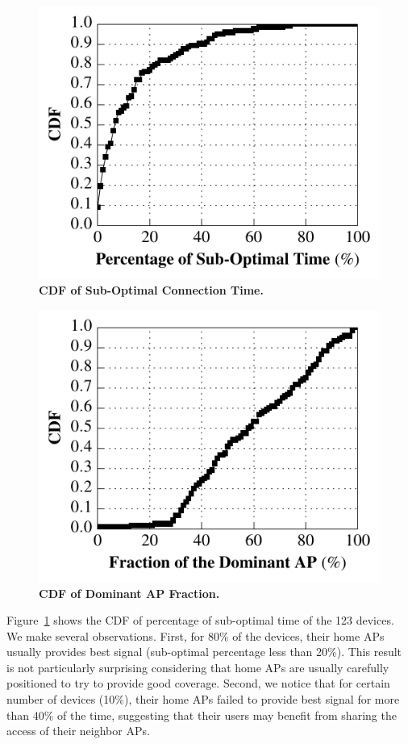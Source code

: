 \begin{figure}[t]
  \centering
  \includegraphics[width=\columnwidth]{./figures/HomeAPSessionRSSI.pdf}
  \caption{\textbf{CDF of Sub-Optimal Connection Time.}}
  \label{fig:suboptimal}
\end{figure}
\begin{figure}[t]
  \centering
  \includegraphics[width=\columnwidth]{./figures/BetterNeighborAPFigure.pdf}
  \caption{\textbf{CDF of Dominant AP Fraction.}}
  \label{fig:dominantap}
\end{figure}

Figure~\ref{fig:suboptimal} shows the CDF of percentage of sub-optimal time of
the 123 devices. We make several observations. First, for 80\% of the devices,
their home APs usually provides best signal (sub-optimal percentage less than
20\%). This result is not particularly surprising considering that home APs are
usually carefully positioned to try to provide good coverage. Second, we notice
that for certain number of devices (10\%), their home APs failed to provide best
signal for more than 40\% of the time, suggesting that their users may benefit
from sharing the \wifi{} access of their neighbor APs.


